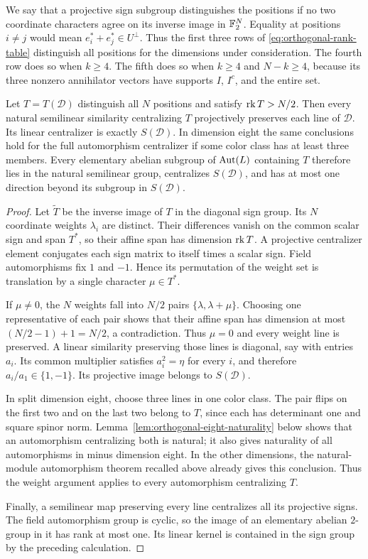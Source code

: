 We say that a projective sign subgroup distinguishes the positions if
no two coordinate characters agree on its inverse image in
$\mathbb F_2^N$.  Equality at positions $i\ne j$ would mean
$e_i^*+e_j^*\in U^\perp$.  Thus the first three rows of
\eqref{eq:orthogonal-rank-table} distinguish all positions for the
dimensions under consideration.  The fourth row does so when $k\ge4$.
The fifth does so when $k\ge4$ and $N-k\ge4$, because its three nonzero
annihilator vectors have supports $I$, $I^c$, and the entire set.

\begin{lemma}\label{lem:orthogonal-centralizer}
Let $T=T(\mathcal D)$ distinguish all $N$ positions and satisfy
$\operatorname{rk} T>N/2$.  Then every natural semilinear similarity centralizing $T$
projectively preserves each line of $\mathcal D$.  Its linear
centralizer is exactly $S(\mathcal D)$.  In dimension eight the same
conclusions hold for the full automorphism centralizer if some color
class has at least three members.  Every elementary abelian subgroup
of $\operatorname{Aut}(L)$ containing $T$ therefore lies in the natural semilinear
group, centralizes $S(\mathcal D)$, and has at most one direction beyond
its subgroup in $S(\mathcal D)$.
\end{lemma}

\begin{proof}
Let $\widetilde T$ be the inverse image of $T$ in the diagonal sign
group.  Its $N$ coordinate weights $\lambda_i$ are distinct.  Their
differences vanish on the common scalar sign and span $T^*$, so their
affine span has dimension $\operatorname{rk} T$.  A projective centralizer element
conjugates each sign matrix to itself times a scalar sign.  Field
automorphisms fix $1$ and $-1$.  Hence its permutation of the weight set
is translation by a single character $\mu\in T^*$.

If $\mu\ne0$, the $N$ weights fall into $N/2$ pairs
$\{\lambda,\lambda+\mu\}$.  Choosing one representative of each pair
shows that their affine span has dimension at most
$(N/2-1)+1=N/2$, a contradiction.  Thus $\mu=0$ and every weight line
is preserved.  A linear similarity preserving those lines is diagonal,
say with entries $a_i$.  Its common multiplier satisfies
$a_i^2=\eta$ for every $i$, and therefore $a_i/a_1\in\{1,-1\}$.
Its projective image belongs to $S(\mathcal D)$.

In split dimension eight, choose three lines in one color class.
The pair flips on the first two and on the last two belong to $T$,
since each has determinant one and square spinor norm.
Lemma~\ref{lem:orthogonal-eight-naturality} below shows that an
automorphism centralizing both is natural; it also gives naturality
of all automorphisms in minus dimension eight. In the other dimensions,
the natural-module automorphism theorem recalled above already gives
this conclusion. Thus the weight argument applies to every
automorphism centralizing $T$.

Finally, a semilinear map preserving every line centralizes all its
projective signs.  The field automorphism group is cyclic, so the image
of an elementary abelian $2$-group in it has rank at most one.  Its
linear kernel is contained in the sign group by the preceding
calculation.
\end{proof}

